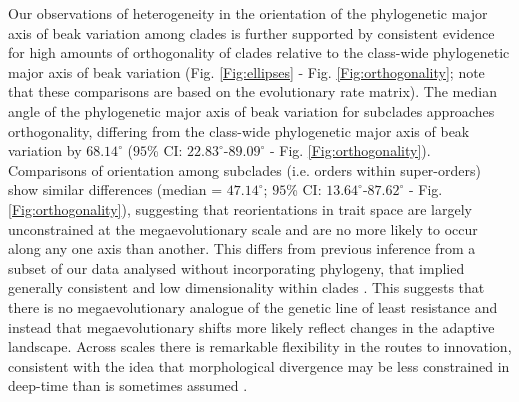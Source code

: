 \documentclass[12pt,letterpaper]{article}
\begin{document}
Our observations of heterogeneity in the orientation of the phylogenetic major axis of beak variation among clades is further supported by consistent evidence for high amounts of orthogonality of clades relative to the class-wide phylogenetic major axis of beak variation (Fig. \ref{Fig:ellipses} - Fig. \ref{Fig:orthogonality}; note that these comparisons are based on the evolutionary rate matrix). %
The median angle of the phylogenetic major axis of beak variation for subclades approaches orthogonality, differing from the class-wide phylogenetic major axis of beak variation by $68.14^\circ$ ($95$\% CI: $22.83^\circ$-$89.09^\circ$ - Fig. \ref{Fig:orthogonality}).
Comparisons of orientation among subclades (i.e. orders within super-orders) show similar differences (median = $47.14^\circ$; $95$\% CI: $13.64^\circ$-$87.62^\circ$ - Fig. \ref{Fig:orthogonality}), suggesting that reorientations in trait space are largely unconstrained at the megaevolutionary scale and are no more likely to occur along any one axis than another. 
This differs from previous inference from a subset of our data analysed  without incorporating phylogeny, that implied generally consistent and low dimensionality within clades \cite{cooney2017mega}.
This suggests that there is no megaevolutionary analogue of the genetic line of least resistance and instead that megaevolutionary shifts more likely reflect changes in the adaptive landscape.
Across scales there is remarkable flexibility in the routes to innovation, consistent with the idea that morphological divergence may be less constrained in deep-time than is sometimes assumed \cite{venditti2011multiple}. %
\end{document}
